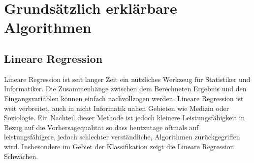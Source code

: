 \documentclass[
  12pt, %
  a4paper, %
  oneside, %
  openany, 
  numbers=noenddot, %
  BCOR=5mm, %
  parskip=half*, %
  thesis, %
]{bfhbook}
\begin{document}
\section{Grundsätzlich erklärbare Algorithmen}
\subsection{Lineare Regression}
Lineare Regression ist seit langer Zeit ein nützliches Werkzeug für Statistiker und Informatiker. Die Zusammenhänge zwischen dem Berechneten Ergebnis und den Eingangsvariablen können einfach nachvollzogen werden. Lineare Regression ist weit verbreitet, auch in nicht Informatik nahen Gebieten wie Medizin oder Soziologie. Ein Nachteil dieser Methode ist jedoch kleinere Leistungsfähigkeit in Bezug auf die Vorhersagequalität so dass heutzutage oftmals auf leistungsfähigere, jedoch schlechter verständliche, Algorithmen zurückgegriffen wird. Insbesondere im Gebiet der Klassifikation zeigt die Lineare Regression Schwächen.
\end{document}
